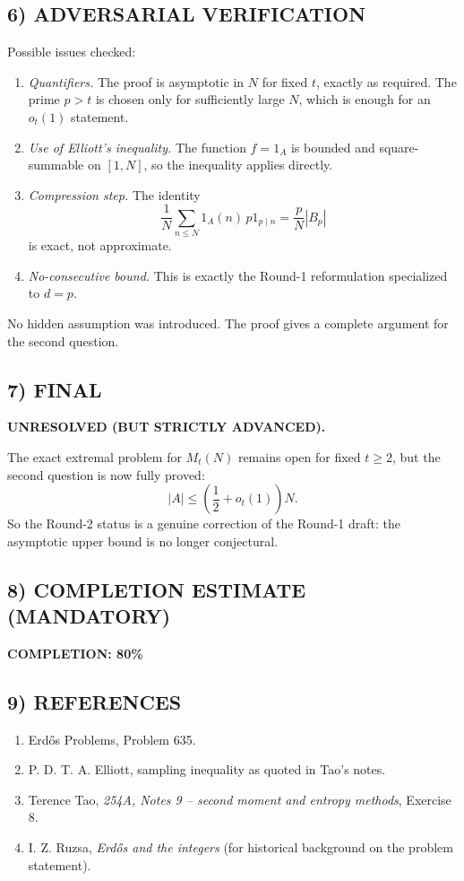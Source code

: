 \subsection*{6) ADVERSARIAL VERIFICATION}
Possible issues checked:
\begin{enumerate}
\item \emph{Quantifiers.} The proof is asymptotic in $N$ for fixed $t$, exactly as required. The prime $p>t$ is chosen only for sufficiently large $N$, which is enough for an $o_t(1)$ statement.
\item \emph{Use of Elliott's inequality.} The function $f=1_A$ is bounded and square-summable on $[1,N]$, so the inequality applies directly.
\item \emph{Compression step.} The identity
\[
\frac1N\sum_{n\le N}1_A(n)\,p1_{p\mid n} = \frac{p}{N}|B_p|
\]
is exact, not approximate.
\item \emph{No-consecutive bound.} This is exactly the Round-1 reformulation specialized to $d=p$.
\end{enumerate}
No hidden assumption was introduced. The proof gives a complete argument for the second question.

\subsection*{7) FINAL}
\textbf{UNRESOLVED (BUT STRICTLY ADVANCED).}

The exact extremal problem for $M_t(N)$ remains open for fixed $t\ge 2$, but the second question is now fully proved:
\[
|A|\le \left(\frac12+o_t(1)\right)N.
\]
So the Round-2 status is a genuine correction of the Round-1 draft: the asymptotic upper bound is no longer conjectural.

\subsection*{8) COMPLETION ESTIMATE (MANDATORY)}
\textbf{COMPLETION: 80\%}

\subsection*{9) REFERENCES}
\begin{enumerate}
\item Erd\H{o}s Problems, Problem 635.
\item P. D. T. A. Elliott, sampling inequality as quoted in Tao's notes.
\item Terence Tao, \emph{254A, Notes 9 -- second moment and entropy methods}, Exercise 8.
\item I. Z. Ruzsa, \emph{Erd\H{o}s and the integers} (for historical background on the problem statement).
\end{enumerate}
